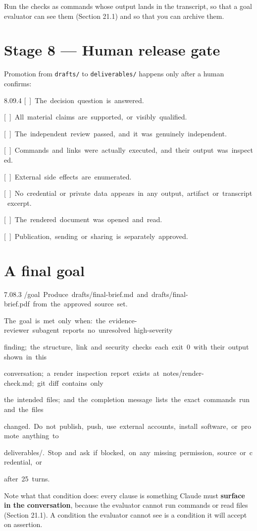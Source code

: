 \documentclass[11pt,a4paper,twoside,openany]{book}
\newcommand{\cl}[1]{\noindent\mbox{#1}\par}
\begin{document}
Run the checks as commands whose output lands in the transcript, so that a goal evaluator can see them (Section 21.1) and so that you can archive them.


\FloatBarrier
\setcounter{section}{8}
\section{Stage 8 — Human release gate}

Promotion from \texttt{drafts/\allowbreak{}} to \texttt{deliverable\allowbreak{}s/\allowbreak{}} happens only after a human confirms:


\begin{codeblock}{8.0}{9.4}
\cl{[~]~The~decision~question~is~answered.}
\cl{[~]~All~material~claims~are~supported,~or~visibly~qualified.}
\cl{[~]~The~independent~review~passed,~and~it~was~genuinely~independent.}
\cl{[~]~Commands~and~links~were~actually~executed,~and~their~output~was~inspected.}
\cl{[~]~External~side~effects~are~enumerated.}
\cl{[~]~No~credential~or~private~data~appears~in~any~output,~artifact~or~transcript~excerpt.}
\cl{[~]~The~rendered~document~was~opened~and~read.}
\cl{[~]~Publication,~sending~or~sharing~is~separately~approved.}
\end{codeblock}

\FloatBarrier
\setcounter{section}{9}
\section{A final goal}

\begin{codeblock}{7.0}{8.3}
\cl{/goal~Produce~drafts/final-brief.md~and~drafts/final-brief.pdf~from~the~approved~source~set.}
\cl{The~goal~is~met~only~when:~the~evidence-reviewer~subagent~reports~no~unresolved~high-severity}
\cl{finding;~the~structure,~link~and~security~checks~each~exit~0~with~their~output~shown~in~this}
\cl{conversation;~a~render~inspection~report~exists~at~notes/render-check.md;~git~diff~contains~only}
\cl{the~intended~files;~and~the~completion~message~lists~the~exact~commands~run~and~the~files}
\cl{changed.~Do~not~publish,~push,~use~external~accounts,~install~software,~or~promote~anything~to}
\cl{deliverables/.~Stop~and~ask~if~blocked,~on~any~missing~permission,~source~or~credential,~or}
\cl{after~25~turns.}
\end{codeblock}

Note what that condition does: every clause is something Claude must \textbf{surface in the conversation}, because the evaluator cannot run commands or read files (Section 21.1). A condition the evaluator cannot see is a condition it will accept on assertion.
\end{document}
